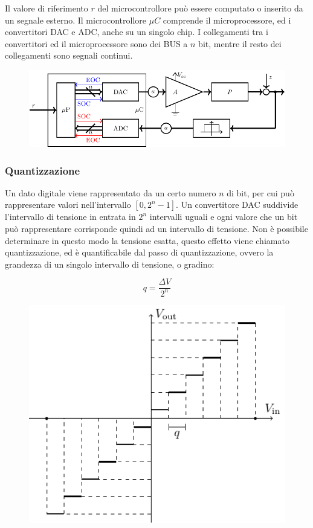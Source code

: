 \documentclass{article}
\numberwithin{equation}{subsection}
\begin{document}
Il valore di riferimento $r$ del microcontrollore può essere computato o inserito da un segnale esterno. Il microcontrollore $\mu C$ comprende il microprocessore, ed i convertitori 
DAC e ADC, anche su un singolo chip. I collegamenti tra i convertitori ed il microprocessore sono dei BUS a $n$ bit, mentre il resto dei collegamenti sono 
segnali continui. 

\begin{figure}[H]%
    \centering
    \includegraphics[width=13cm]{microcontrollore.pdf}%
\end{figure}

\subsubsection{Quantizzazione}

Un dato digitale viene rappresentato da un certo numero $n$ di bit, per cui può rappresentare valori nell'intervallo $[0,2^n-1]$. Un convertitore DAC suddivide l'intervallo 
di tensione in entrata in $2^n$ intervalli uguali e ogni valore che un bit può rappresentare corrisponde quindi ad un intervallo di tensione. Non è possibile determinare 
in questo modo la tensione esatta, questo effetto viene chiamato quantizzazione, ed è quantificabile dal passo di quantizzazione, ovvero la grandezza di un singolo intervallo 
di tensione, o gradino:

\begin{equation}
    q=\displaystyle\frac{\Delta V}{2^n}
\end{equation}

\begin{figure}[H]%
    \centering
    \includegraphics{quantizzazione.pdf}%
\end{figure}
\end{document}
